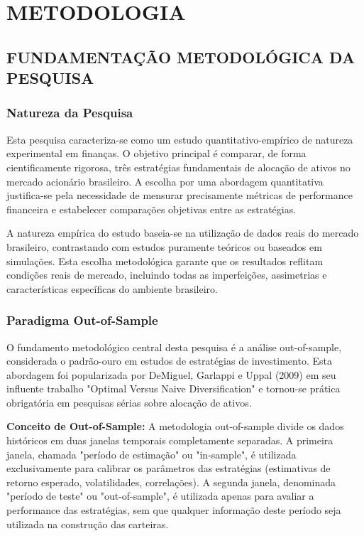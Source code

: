 
\chapter{METODOLOGIA}

\section{FUNDAMENTAÇÃO METODOLÓGICA DA PESQUISA}

\subsection{Natureza da Pesquisa}

Esta pesquisa caracteriza-se como um estudo quantitativo-empírico de natureza experimental em finanças. O objetivo principal é comparar, de forma cientificamente rigorosa, três estratégias fundamentais de alocação de ativos no mercado acionário brasileiro. A escolha por uma abordagem quantitativa justifica-se pela necessidade de mensurar precisamente métricas de performance financeira e estabelecer comparações objetivas entre as estratégias.

A natureza empírica do estudo baseia-se na utilização de dados reais do mercado brasileiro, contrastando com estudos puramente teóricos ou baseados em simulações. Esta escolha metodológica garante que os resultados reflitam condições reais de mercado, incluindo todas as imperfeições, assimetrias e características específicas do ambiente brasileiro.

\subsection{Paradigma Out-of-Sample}

O fundamento metodológico central desta pesquisa é a análise out-of-sample, considerada o padrão-ouro em estudos de estratégias de investimento. Esta abordagem foi popularizada por DeMiguel, Garlappi e Uppal (2009) em seu influente trabalho "Optimal Versus Naive Diversification" e tornou-se prática obrigatória em pesquisas sérias sobre alocação de ativos.

\textbf{Conceito de Out-of-Sample:} A metodologia out-of-sample divide os dados históricos em duas janelas temporais completamente separadas. A primeira janela, chamada "período de estimação" ou "in-sample", é utilizada exclusivamente para calibrar os parâmetros das estratégias (estimativas de retorno esperado, volatilidades, correlações). A segunda janela, denominada "período de teste" ou "out-of-sample", é utilizada apenas para avaliar a performance das estratégias, sem que qualquer informação deste período seja utilizada na construção das carteiras.

